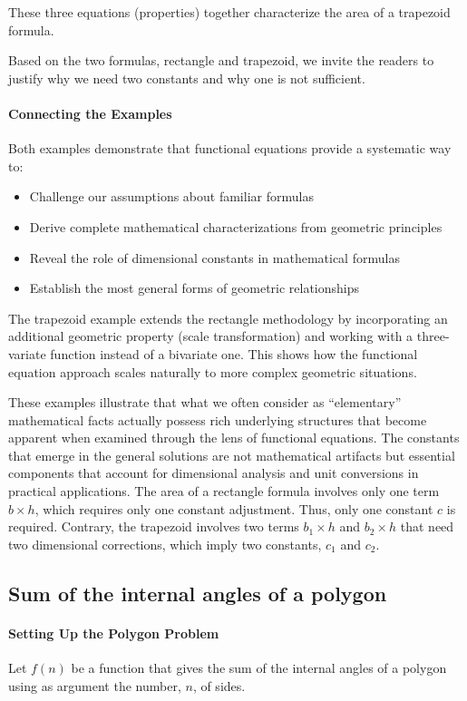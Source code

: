 These three equations (properties) together characterize the area of a trapezoid formula.

Based on the two formulas, rectangle and trapezoid, we invite the readers to justify why we need two constants and why one is not sufficient.

\paragraph{Connecting the Examples}
Both examples demonstrate that functional equations provide a systematic way to:
\begin{itemize}
\item Challenge our assumptions about familiar formulas
\item Derive complete mathematical characterizations from geometric principles
\item Reveal the role of dimensional constants in mathematical formulas
\item Establish the most general forms of geometric relationships
\end{itemize}

The trapezoid example extends the rectangle methodology by incorporating an additional geometric property (scale transformation) and working with a three-variate function instead of a bivariate one. This shows how the functional equation approach scales naturally to more complex geometric situations.

These examples illustrate that what we often consider as ``elementary'' mathematical facts actually possess rich underlying structures that become apparent when examined through the lens of functional equations. The constants that emerge in the general solutions are not mathematical artifacts but essential components that account for dimensional analysis and unit conversions in practical applications. The area of a rectangle formula involves only one term $b \times h$, which requires only one constant adjustment. Thus, only one constant $c$ is required. Contrary, the trapezoid involves two terms $b_1 \times h$ and $b_2 \times h$ that need two dimensional corrections, which imply two constants, $c_1$ and $c_2$.

\subsection{Sum of the internal angles of a polygon}
\paragraph{Setting Up the Polygon Problem}
Let $f(n)$ be a function that gives the sum of the internal angles of a polygon using as argument the number, $n$, of sides.

